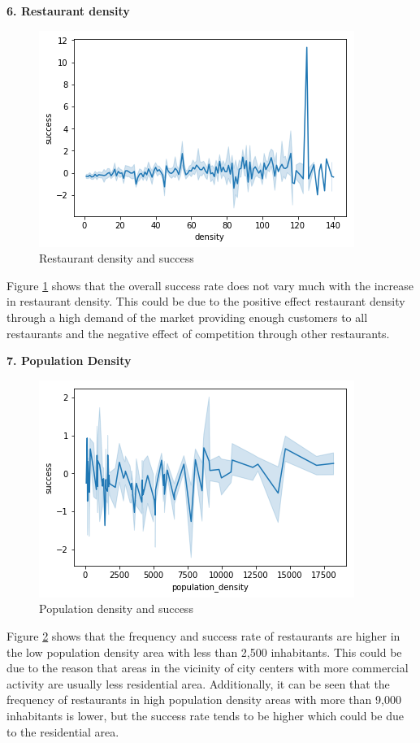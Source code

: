 \documentclass[a4paper, 11pt, oneside]{Thesis}  %
\begin{document}
\textbf{6.	Restaurant density}
 
\begin{figure}[h]
\includegraphics[scale=0.7]{Figures/Exploratory/lineplot_restaurant_densities.png}
\centering
\caption{Restaurant density and success}
\label{fig:lineplot_restaurant_densities}
\end{figure}

Figure \ref{fig:lineplot_restaurant_densities} shows that the overall success rate does not vary much with the increase in restaurant density. This could be due to the positive effect restaurant density through a high demand of the market providing enough customers to all restaurants and the negative effect of competition through other restaurants.

\textbf{7.	Population Density}
 
\begin{figure}[h]
\includegraphics[scale=0.7]{Figures/Exploratory/lineplot_population_density.png}
\centering
\caption{Population density and success}
\label{fig:lineplot_population_density}
\end{figure}

Figure \ref{fig:lineplot_population_density} shows that the frequency and success rate of restaurants are higher in the low population density area with less than 2,500 inhabitants. This could be due to the reason that areas in the vicinity of city centers with more commercial activity are usually less residential area. Additionally, it can be seen that the frequency of restaurants in high population density areas with more than 9,000 inhabitants is lower, but the success rate tends to be higher which could be due to the residential area.
\end{document}
